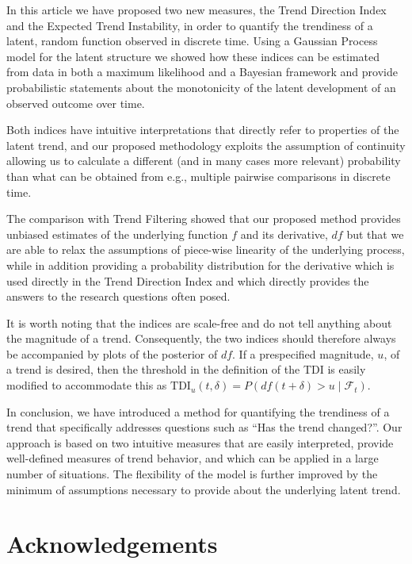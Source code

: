 \documentclass[
  11pt,
]{article}
\theoremstyle{nonumberplain}
\begin{document}
In this article we have proposed two new measures, the Trend Direction
Index and the Expected Trend Instability, in order to quantify the
trendiness of a latent, random function observed in discrete time. Using
a Gaussian Process model for the latent structure we showed how these
indices can be estimated from data in both a maximum likelihood and a
Bayesian framework and provide probabilistic statements about the
monotonicity of the latent development of an observed outcome over time.

Both indices have intuitive interpretations that directly refer to
properties of the latent trend, and our proposed methodology exploits
the assumption of continuity allowing us to calculate a different (and
in many cases more relevant) probability than what can be obtained from
e.g., multiple pairwise comparisons in discrete time.

The comparison with Trend Filtering showed that our proposed method
provides unbiased estimates of the underlying function \(f\) and its
derivative, \(df\) but that we are able to relax the assumptions of
piece-wise linearity of the underlying process, while in addition
providing a probability distribution for the derivative which is used
directly in the Trend Direction Index and which directly provides the
answers to the research questions often posed.

It is worth noting that the indices are scale-free and do not tell
anything about the magnitude of a trend. Consequently, the two indices
should therefore always be accompanied by plots of the posterior of
\(df\). If a prespecified magnitude, \(u\), of a trend is desired, then
the threshold in the definition of the TDI is easily modified to
accommodate this as
\(\mathrm{TDI}_u(t, \delta) = P(df(t + \delta) > u \mid \mathcal{F}_t)\).

In conclusion, we have introduced a method for quantifying the
trendiness of a trend that specifically addresses questions such as
``Has the trend changed?''. Our approach is based on two intuitive
measures that are easily interpreted, provide well-defined measures of
trend behavior, and which can be applied in a large number of
situations. The flexibility of the model is further improved by the
minimum of assumptions necessary to provide about the underlying latent
trend.

\hypertarget{acknowledgements}{%
\section*{Acknowledgements}\label{acknowledgements}}
\end{document}
